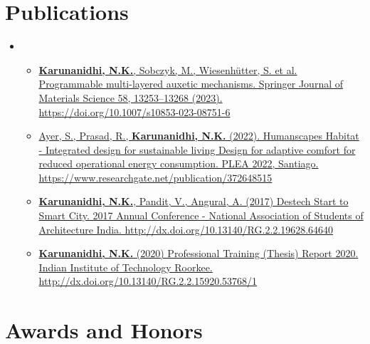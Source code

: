 \documentclass[letterpaper,11pt]{article}
\newcommand{\resumeItem}[1]{
  \item\small{
    {#1 \vspace{-2pt}}
  }
}
\newcommand{\resumeSubHeadingListStart}{\begin{itemize}[leftmargin=0.0in, label={}]}
\newcommand{\resumeSubHeadingListEnd}{\end{itemize}}
\newcommand{\resumeItemListStart}{\begin{itemize}}
\newcommand{\resumeItemListEnd}{\end{itemize}\vspace{-5pt}}
\begin{document}
\section{Publications}
    
    \resumeSubHeadingListStart
        \item
          \resumeItemListStart
            \resumeItem{\href{https://doi.org/10.1007/s10853-023-08751-6}{\textbf{Karunanidhi, N.K.}, Sobczyk, M., Wiesenhütter, S. et al. \underline{Programmable multi-layered auxetic mechanisms}. Springer Journal of Materials Science 58, 13253–13268 (2023). https://doi.org/10.1007/s10853-023-08751-6}}
            \resumeItem{\href{https://www.researchgate.net/publication/372648515_Humanscapes_Habitat_-_Integrated_design_for_sustainable_living_Design_for_adaptive_comfort_for_reduced_operational_energy_consumption}{Ayer, S., Prasad, R., \textbf{Karunanidhi, N.K.} (2022). Humanscapes Habitat - Integrated design for sustainable living Design for adaptive comfort for reduced operational energy consumption. PLEA 2022, Santiago. https://www.researchgate.net/publication/372648515} }
            
            \resumeItem{\href{http://dx.doi.org/10.13140/RG.2.2.19628.64640}{\textbf{Karunanidhi, N.K.}, Pandit, V., Angural, A. (2017) Destech Start to Smart City. 2017 Annual Conference - National Association of Students of Architecture India. http://dx.doi.org/10.13140/RG.2.2.19628.64640}}
            
            \resumeItem{\href{http://dx.doi.org/10.13140/RG.2.2.15920.53768/1}{\textbf{Karunanidhi, N.K.} (2020) Professional Training (Thesis) Report 2020. Indian Institute of Technology Roorkee. http://dx.doi.org/10.13140/RG.2.2.15920.53768/1}}
            
          \resumeItemListEnd
          
    \resumeSubHeadingListEnd
\vspace{-8 pt}

\section{Awards and Honors}
    
\end{document}
